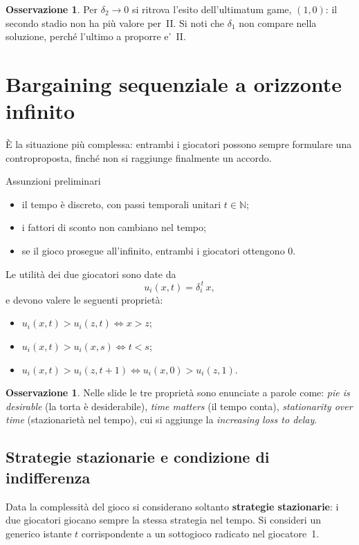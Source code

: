\documentclass[12pt,a4paper,twoside]{book}
\theoremstyle{plain}
\theoremstyle{definition}
\newtheorem{remark}[theorem]{Osservazione}
\begin{document}
\begin{remark}
Per $\delta_2\to0$ si ritrova l'esito dell'ultimatum game, $(1,0)$: il secondo stadio non ha
più valore per~II. Si noti che $\delta_1$ non compare nella soluzione, perché l'ultimo a
proporre e'~II.
\end{remark}

\section{Bargaining sequenziale a orizzonte infinito}

È la situazione più complessa: entrambi i giocatori possono sempre formulare una
controproposta, finché non si raggiunge finalmente un accordo.

\begin{defbox}{Assunzioni preliminari}
\begin{itemize}
  \item il tempo è discreto, con passi temporali unitari $t\in\mathbb{N}$;
  \item i fattori di sconto non cambiano nel tempo;
  \item se il gioco prosegue all'infinito, entrambi i giocatori ottengono $0$.
\end{itemize}
Le utilità dei due giocatori sono date da
\[
  u_i(x,t)=\delta_i^{\,t}\,x ,
\]
e devono valere le seguenti proprietà:
\begin{itemize}
  \item $u_i(x,t)>u_i(z,t)\iff x>z$;
  \item $u_i(x,t)>u_i(x,s)\iff t<s$;
  \item $u_i(x,t)>u_i(z,t+1)\iff u_i(x,0)>u_i(z,1)$.
\end{itemize}
\end{defbox}

\begin{remark}
Nelle slide le tre proprietà sono enunciate a parole come: \emph{pie is desirable} (la torta
è desiderabile), \emph{time matters} (il tempo conta), \emph{stationarity over time}
(stazionarietà nel tempo), cui si aggiunge la \emph{increasing loss to delay}.
\end{remark}

\subsection{Strategie stazionarie e condizione di indifferenza}

Data la complessità del gioco si considerano soltanto \textbf{strategie stazionarie}: i due
giocatori giocano sempre la stessa strategia nel tempo. Si consideri un generico istante $t$
corrispondente a un sottogioco radicato nel giocatore~1.
\end{document}
